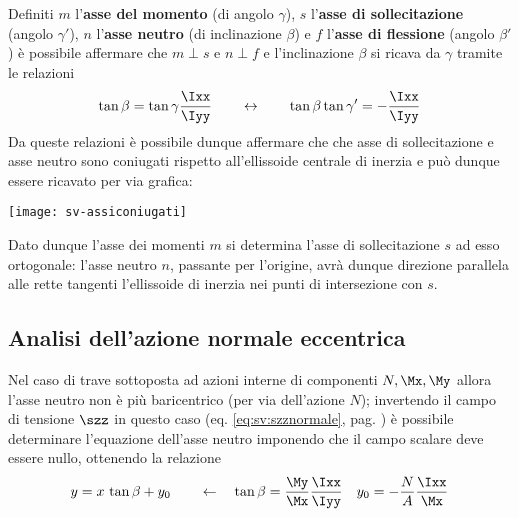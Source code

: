 		\begin{concetto}
			Definiti $m$ l'\textbf{asse del momento} (di angolo $\gamma$), $s$ l'\textbf{asse di sollecitazione} (angolo $\gamma'$), $n$ l'\textbf{asse neutro} (di inclinazione $\beta$) e $f$ l'\textbf{asse di flessione} (angolo $\beta'$) è possibile affermare che $m\perp s$ e $n\perp f$ e l'inclinazione $\beta$ si ricava da $\gamma$ tramite le relazioni
			\[ \tan\beta = \tan\gamma \frac \Ixx \Iyy \qquad \leftrightarrow\qquad \tan\beta \tan\gamma' = - \frac \Ixx \Iyy \]
			Da queste relazioni è possibile dunque affermare che che asse di sollecitazione e asse neutro sono coniugati rispetto all'ellissoide centrale di inerzia e può dunque essere ricavato per via grafica:
			\begin{center}
				\texttt{[image: sv-assiconiugati]}
			\end{center}			
		\end{concetto}
		Dato dunque l'asse dei momenti $m$ si determina l'asse di sollecitazione $s$ ad esso ortogonale: l'asse neutro $n$, passante per l'origine, avrà dunque direzione parallela alle rette tangenti l'ellissoide di inerzia nei punti di intersezione con $s$.
		
	\subsection{Analisi dell'azione normale eccentrica}
		Nel caso di trave sottoposta ad azioni interne di componenti $N, \Mx,\My$ allora l'asse neutro non è più baricentrico (per via dell'azione $N$); invertendo il campo di tensione $\szz$ in questo caso (eq. \ref{eq:sv:szznormale}, pag. \pageref{eq:sv:szznormale}) è possibile determinare l'equazione dell'asse neutro imponendo che il campo scalare deve essere nullo, ottenendo la relazione
		\[ y = x\, \tan\beta + y_0 \qquad \leftarrow\quad \tan\beta= \frac \My \Mx \frac \Ixx \Iyy \quad y_0 = - \frac N A \frac \Ixx \Mx  \]
		
